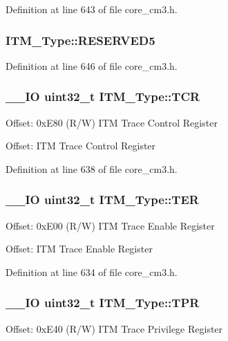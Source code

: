 Definition at line 643 of file core\-\_\-cm3.\-h.

\hypertarget{struct_i_t_m___type_aa4c25e1a29587506b4802bc48b23b3ee}{
\subsubsection[{R\-E\-S\-E\-R\-V\-E\-D5}]{ I\-T\-M\-\_\-\-Type\-::\-R\-E\-S\-E\-R\-V\-E\-D5}}\label{struct_i_t_m___type_aa4c25e1a29587506b4802bc48b23b3ee}


Definition at line 646 of file core\-\_\-cm3.\-h.

\hypertarget{struct_i_t_m___type_a58f169e1aa40a9b8afb6296677c3bb45}{
\subsubsection[{T\-C\-R}]{\setlength{\rightskip}{0pt plus 5cm}\-\_\-\-\_\-\-I\-O {\bf uint32\-\_\-t} I\-T\-M\-\_\-\-Type\-::\-T\-C\-R}}\label{struct_i_t_m___type_a58f169e1aa40a9b8afb6296677c3bb45}
Offset\-: 0x\-E80 (R/\-W) I\-T\-M Trace Control Register

Offset\-: I\-T\-M Trace Control Register 

Definition at line 638 of file core\-\_\-cm3.\-h.

\hypertarget{struct_i_t_m___type_a91a040e1b162e1128ac1e852b4a0e589}{
\subsubsection[{T\-E\-R}]{\setlength{\rightskip}{0pt plus 5cm}\-\_\-\-\_\-\-I\-O {\bf uint32\-\_\-t} I\-T\-M\-\_\-\-Type\-::\-T\-E\-R}}\label{struct_i_t_m___type_a91a040e1b162e1128ac1e852b4a0e589}
Offset\-: 0x\-E00 (R/\-W) I\-T\-M Trace Enable Register

Offset\-: I\-T\-M Trace Enable Register 

Definition at line 634 of file core\-\_\-cm3.\-h.

\hypertarget{struct_i_t_m___type_a93b480aac6da620bbb611212186d47fa}{
\subsubsection[{T\-P\-R}]{\setlength{\rightskip}{0pt plus 5cm}\-\_\-\-\_\-\-I\-O {\bf uint32\-\_\-t} I\-T\-M\-\_\-\-Type\-::\-T\-P\-R}}\label{struct_i_t_m___type_a93b480aac6da620bbb611212186d47fa}
Offset\-: 0x\-E40 (R/\-W) I\-T\-M Trace Privilege Register

